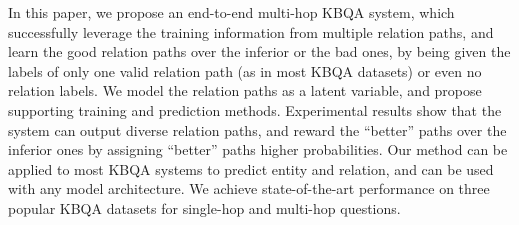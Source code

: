 In this paper, we propose an end-to-end multi-hop KBQA system, which successfully leverage the training information from multiple relation paths, and learn the good relation paths over the inferior or the bad ones, by being given the labels of only one valid relation path (as in most KBQA datasets) or even no relation labels. We model the relation paths as a latent variable, and propose supporting training and prediction methods. Experimental results show that the system can output diverse relation paths, and reward the ``better'' paths over the inferior ones by assigning ``better'' paths higher probabilities. Our method can be applied to most KBQA systems to predict entity and relation, and can be used with any model architecture. We achieve state-of-the-art performance on three popular KBQA datasets for single-hop and multi-hop questions.%
